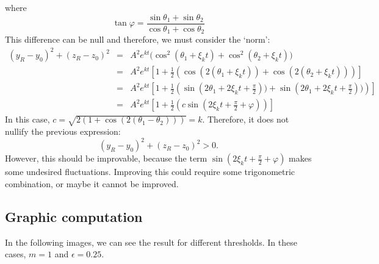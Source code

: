 \documentclass[a4paper,preprint,11pt]{article}
\begin{document}
where
$$
\tan\varphi = \frac{\sin\theta_1+\sin\theta_2}{\cos\theta_1+\cos\theta_2}
$$
This difference can be null and therefore, we must consider the `norm':
$$
\begin{array}{ccl}
(y_R-y_0)^2+(z_R-z_0)^2 & = & A^2e^{kt}\Big(\cos^2(\theta_1+\xi_k t) + \cos^2(\theta_2+\xi_k t)\Big) \\
& = & A^2e^{kt}\left[1 + \frac{1}{2}\left(\cos(2(\theta_1+\xi_kt)) + \cos(2(\theta_2+\xi_kt)) \right)\right] \\
& = & A^2e^{kt}\left[1 + \frac{1}{2}\left(\sin(2\theta_1+2\xi_kt+\frac{\pi}{2})) + \sin(2\theta_1+2\xi_kt+\frac{\pi}{2})) \right)\right] \\
& = & A^2e^{kt}\left[1 + \frac{1}{2}\left(c\sin(2\xi_kt+\frac{\pi}{2}+\varphi) \right)\right]
\end{array}
$$
In this case, $c=\sqrt{2(1+\cos(2(\theta_1-\theta_2)))}= k$. Therefore, it does not nullify the previous expression:
$$
(y_R-y_0)^2+(z_R-z_0)^2 > 0.
$$
However, this should be improvable, because the term $\sin(2\xi_kt+\frac{\pi}{2}+\varphi)$ makes some undesired fluctuations. Improving this could require some trigonometric combination, or maybe it cannot be improved.

\subsection{Graphic computation}
In the following images, we can see the result for different thresholds. In these cases, $m=1$ and $\epsilon=0.25$.

\end{document}
